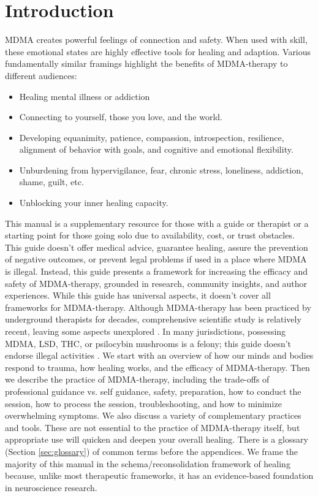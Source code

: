 \documentclass[12pt,letterpaper]{article}
\begin{document}
\section{Introduction}
MDMA creates powerful feelings of connection and safety. When used with skill, these emotional states are highly effective tools for healing and adaption. Various fundamentally similar framings highlight the benefits of MDMA-therapy to different audiences:
\begin{itemize}
    \item Healing mental illness or addiction
    \item Connecting to yourself, those you love, and the world.
    \item Developing equanimity, patience, compassion, introspection, resilience, alignment of behavior with goals, and cognitive and emotional flexibility.
    \item Unburdening from hypervigilance, fear, chronic stress, loneliness, addiction, shame, guilt, etc.
    \item Unblocking your inner healing capacity.
\end{itemize}
This manual is a supplementary resource for those with a guide or therapist or a starting point for those going solo due to availability, cost, or trust obstacles. This guide doesn't offer medical advice, guarantee healing, assure the prevention of negative outcomes, or prevent legal problems if used in a place where MDMA is illegal. Instead, this guide presents a framework for increasing the efficacy and safety of MDMA-therapy, grounded in research, community insights, and author experiences. While this guide has universal aspects, it doesn't cover all frameworks for MDMA-therapy. Although MDMA-therapy has been practiced by underground therapists for decades, comprehensive scientific study is relatively recent, leaving some aspects unexplored \cite{passieHistory}. In many jurisdictions, possessing MDMA, LSD, THC, or psilocybin mushrooms is a felony; this guide doesn't endorse illegal activities \cite{alphaLegalization}.
We start with an overview of how our minds and bodies respond to trauma, how healing works, and the efficacy of MDMA-therapy. Then we describe the practice of MDMA-therapy, including the trade-offs of professional guidance vs. self guidance, safety, preparation, how to conduct the session, how to process the session, troubleshooting, and how to minimize overwhelming symptoms. We also discuss a variety of complementary practices and tools. These are not essential to the practice of MDMA-therapy itself, but appropriate use will quicken and deepen your overall healing. There is a glossary (Section \ref{sec:glossary}) of common terms before the appendices. We frame the majority of this manual in the schema/reconsolidation framework of healing because, unlike most therapeutic frameworks, it has an evidence-based foundation in neuroscience research. 
\end{document}
